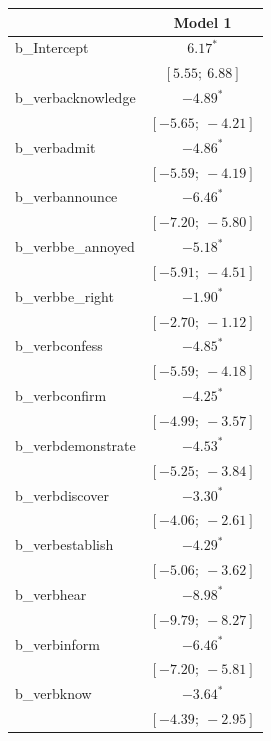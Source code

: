 \documentclass[11pt,fleqn]{article}
\newcommand{\6}{\mbox{$[\hspace*{-.6mm}[$}}
\newcommand{\9}{\mbox{$]\hspace*{-.6mm}]$}}
\begin{document}
{\begin{table}
\begin{center}
\begin{tabular}{l c }
\hline
 & Model 1 \\
\hline
b\_Intercept        & $6.17^{*}$          \\
                    & $[5.55;\ 6.88]$     \\
b\_verbacknowledge  & $-4.89^{*}$         \\
                    & $[-5.65;\ -4.21]$   \\
b\_verbadmit        & $-4.86^{*}$         \\
                    & $[-5.59;\ -4.19]$   \\
b\_verbannounce     & $-6.46^{*}$         \\
                    & $[-7.20;\ -5.80]$   \\
b\_verbbe\_annoyed  & $-5.18^{*}$         \\
                    & $[-5.91;\ -4.51]$   \\
b\_verbbe\_right    & $-1.90^{*}$         \\
                    & $[-2.70;\ -1.12]$   \\
b\_verbconfess      & $-4.85^{*}$         \\
                    & $[-5.59;\ -4.18]$   \\
b\_verbconfirm      & $-4.25^{*}$         \\
                    & $[-4.99;\ -3.57]$   \\
b\_verbdemonstrate  & $-4.53^{*}$         \\
                    & $[-5.25;\ -3.84]$   \\
b\_verbdiscover     & $-3.30^{*}$         \\
                    & $[-4.06;\ -2.61]$   \\
b\_verbestablish    & $-4.29^{*}$         \\
                    & $[-5.06;\ -3.62]$   \\
b\_verbhear         & $-8.98^{*}$         \\
                    & $[-9.79;\ -8.27]$   \\
b\_verbinform       & $-6.46^{*}$         \\
                    & $[-7.20;\ -5.81]$   \\
b\_verbknow         & $-3.64^{*}$         \\
                    & $[-4.39;\ -2.95]$   \\

\end{tabular}
\end{center}
\end{table}}
\end{document}
